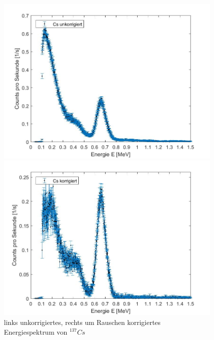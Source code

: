 \documentclass[aps,twocolumn,secnumarabic,nobalancelastpage,amsmath,amssymb,
nofootinbib,superscriptaddress]{revtex4-1}
\begin{document}
\begin{figure}[h]
  \begin{minipage}[t]{0.49\textwidth}
    \includegraphics[width=\textwidth]{../Messung/Csuk.jpg}
  \end{minipage}
  \begin{minipage}[t]{0.49\textwidth}
    \includegraphics[width=\textwidth]{../Messung/Csk.jpg}
  \end{minipage}
  \caption{\label{fig:CsUnkK} links unkorrigiertes, rechts um Rauschen korrigiertes Energiespektrum von $^{137}Cs$}
\end{figure}
\end{document}
